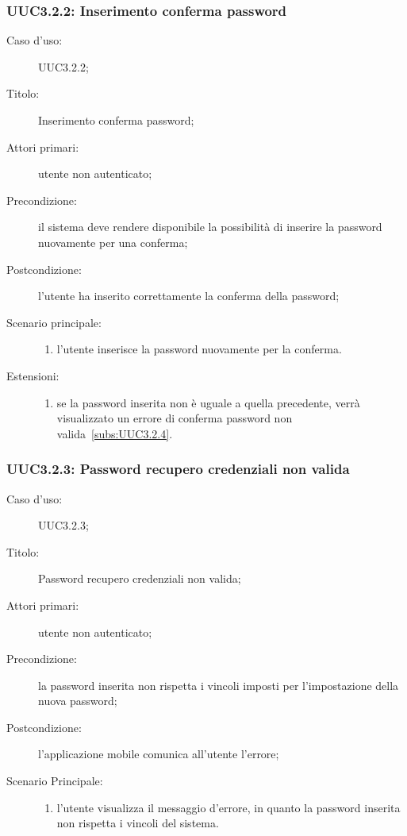 \documentclass[../../../analisi-dei-requisiti.tex]{subfiles}
\begin{document}
\subsubsection{UUC3.2.2: Inserimento conferma password}%
\label{subs:UUC3.2.2}
\begin{description}
  \item[Caso d'uso:] UUC3.2.2;
  \item[Titolo:] Inserimento conferma password;
  \item[Attori primari:] utente non autenticato;
  \item[Precondizione:] il sistema deve rendere disponibile la possibilità di inserire la password nuovamente per una conferma;
  \item[Postcondizione:] l'utente ha inserito correttamente la conferma della password;
  \item[Scenario principale:]
        \begin{enumerate}
          \item l'utente inserisce la password nuovamente per la conferma.
        \end{enumerate}
  \item[Estensioni:]
        \begin{enumerate}
          \item se la password inserita non è uguale a quella precedente, verrà visualizzato un errore di conferma password non valida~\ref{subs:UUC3.2.4}.
        \end{enumerate}
\end{description}

\subsubsection{UUC3.2.3: Password recupero credenziali non valida}%
\label{subs:UUC3.2.3}
\begin{description}
  \item[Caso d'uso:] UUC3.2.3;
  \item[Titolo:] Password recupero credenziali non valida;
  \item[Attori primari:] utente non autenticato;
  \item[Precondizione:] la password inserita non rispetta i vincoli imposti per l'impostazione della nuova password;
  \item[Postcondizione:] l'applicazione mobile comunica all'utente l'errore;
  \item[Scenario Principale:]
        \begin{enumerate}
          \item l'utente visualizza il messaggio d'errore, in quanto la password inserita non rispetta i vincoli del sistema.
        \end{enumerate}
\end{description}
\end{document}
